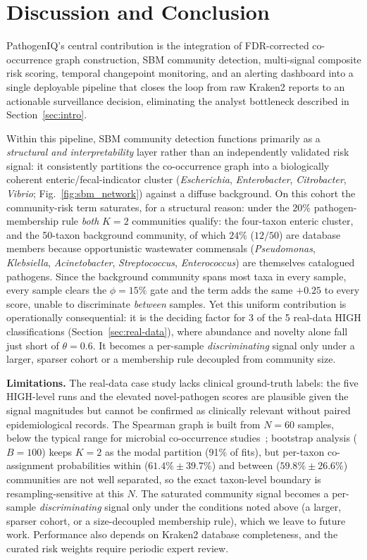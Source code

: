 \documentclass[conference]{IEEEtran}
\begin{document}
\section{Discussion and Conclusion}

PathogenIQ's central contribution is the integration of FDR-corrected
co-occurrence graph construction, SBM community detection, multi-signal
composite risk scoring, temporal changepoint monitoring, and an alerting
dashboard into a single deployable pipeline that closes the loop from raw
Kraken2 reports to an actionable surveillance decision, eliminating the
analyst bottleneck described in Section~\ref{sec:intro}.

Within this pipeline, SBM community detection functions primarily as a
\emph{structural and interpretability} layer rather than an
independently validated risk signal: it consistently partitions the
co-occurrence graph into a biologically coherent
enteric/fecal-indicator cluster (\emph{Escherichia},
\emph{Enterobacter}, \emph{Citrobacter}, \emph{Vibrio};
Fig.~\ref{fig:sbm_network}) against a diffuse background. On this cohort the community-risk term saturates,
for a structural reason: under the $20\%$ pathogen-membership rule
\emph{both} $K=2$ communities qualify: the four-taxon enteric
cluster, and the 50-taxon background community, of which $24\%$
($12/50$) are database members because opportunistic wastewater
commensals (\emph{Pseudomonas}, \emph{Klebsiella}, \emph{Acinetobacter},
\emph{Streptococcus}, \emph{Enterococcus}) are themselves catalogued
pathogens. Since the background community spans most taxa in every
sample, every sample clears the $\phi=15\%$ gate and the term adds the
same $+0.25$ to every score, unable to discriminate \emph{between}
samples. Yet this uniform contribution is operationally consequential:
it is the deciding factor for 3 of the 5 real-data HIGH classifications
(Section~\ref{sec:real-data}), where abundance and novelty alone fall
just short of $\theta=0.6$. It becomes a per-sample \emph{discriminating}
signal only under a larger, sparser cohort or a membership rule
decoupled from community size.

\textbf{Limitations.} The real-data case study lacks clinical
ground-truth labels: the five HIGH-level runs and the elevated
novel-pathogen scores are plausible given the signal magnitudes but
cannot be confirmed as clinically relevant without paired
epidemiological records. The Spearman graph is built from $N=60$
samples, below the typical range for microbial co-occurrence
studies~\cite{Barber2012}; bootstrap analysis ($B=100$) keeps $K=2$ as
the modal partition (91\% of fits), but per-taxon co-assignment
probabilities within ($61.4\% \pm 39.7\%$) and between ($59.8\% \pm
26.6\%$) communities are not well separated, so the exact taxon-level
boundary is resampling-sensitive at this $N$. The saturated community
signal becomes a per-sample \emph{discriminating} signal only under the
conditions noted above (a larger, sparser cohort, or a size-decoupled
membership rule), which we leave to future work. Performance also
depends on Kraken2 database completeness, and the curated risk weights
require periodic expert review.
\end{document}
